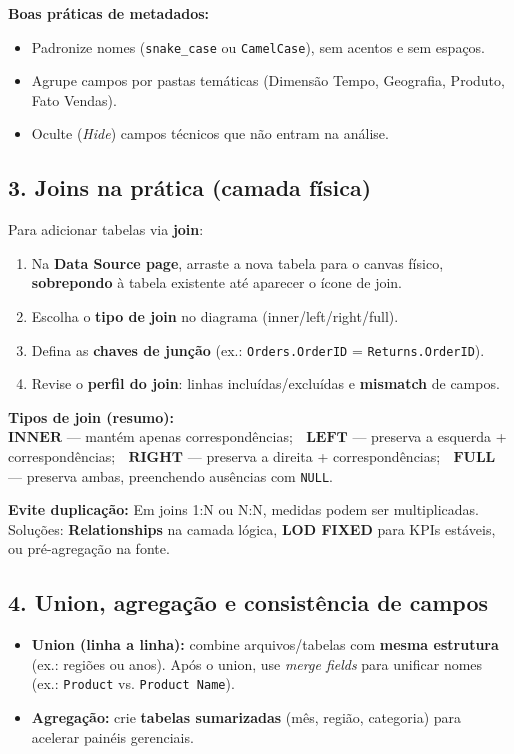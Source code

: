 \begin{NoteBox}
\textbf{Boas práticas de metadados:}
\begin{itemize}[leftmargin=*]
  \item Padronize nomes (\texttt{snake\_case} ou \texttt{CamelCase}), sem acentos e sem espaços.  
  \item Agrupe campos por pastas temáticas (Dimensão Tempo, Geografia, Produto, Fato Vendas).
  \item Oculte (\textit{Hide}) campos técnicos que não entram na análise.
\end{itemize}
\end{NoteBox}

\subsection*{3. Joins na prática (camada física)}
Para adicionar tabelas via \textbf{join}:
\begin{enumerate}[leftmargin=*]
  \item Na \textbf{Data Source page}, arraste a nova tabela para o canvas físico, \textbf{sobrepondo} à tabela existente até aparecer o ícone de join.
  \item Escolha o \textbf{tipo de join} no diagrama (inner/left/right/full).
  \item Defina as \textbf{chaves de junção} (ex.: \texttt{Orders.OrderID} = \texttt{Returns.OrderID}).  
  \item Revise o \textbf{perfil do join}: linhas incluídas/excluídas e \textbf{mismatch} de campos.
\end{enumerate}

\begin{FormulaBox}
\textbf{Tipos de join (resumo):}\\[3pt]
\(\textbf{INNER}\) — mantém apenas correspondências; \(\;\)
\(\textbf{LEFT}\) — preserva a esquerda + correspondências; \(\;\)
\(\textbf{RIGHT}\) — preserva a direita + correspondências; \(\;\)
\(\textbf{FULL}\) — preserva ambas, preenchendo ausências com \texttt{NULL}.
\end{FormulaBox}

\begin{NoteBox}
\textbf{Evite duplicação:} Em joins 1:N ou N:N, medidas podem ser multiplicadas.  
Soluções: \textbf{Relationships} na camada lógica, \textbf{LOD FIXED} para KPIs estáveis, ou pré-agregação na fonte.
\end{NoteBox}

\subsection*{4. Union, agregação e consistência de campos}
\begin{itemize}[leftmargin=*]
  \item \textbf{Union (linha a linha):} combine arquivos/tabelas com \textbf{mesma estrutura} (ex.: regiões ou anos).  
  Após o union, use \textit{merge fields} para unificar nomes (ex.: \texttt{Product} vs. \texttt{Product Name}).
  \item \textbf{Agregação:} crie \textbf{tabelas sumarizadas} (mês, região, categoria) para acelerar painéis gerenciais.
\end{itemize}

